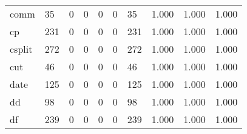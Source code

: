 \begin{longtable}{lp{2.0cm}p{2.0cm}p{2.0cm}p{2.0cm}p{2.0cm}p{2.0cm}p{2.0cm}p{2.0cm}p{2.0cm}}
comm      &                     35 &                                             0 &                                            0 &                                           0 &                                            0 &                                         35 &                                1.000 &                                  1.000 &                                1.000 \\
cp        &                    231 &                                             0 &                                            0 &                                           0 &                                            0 &                                        231 &                                1.000 &                                  1.000 &                                1.000 \\
csplit    &                    272 &                                             0 &                                            0 &                                           0 &                                            0 &                                        272 &                                1.000 &                                  1.000 &                                1.000 \\
cut       &                     46 &                                             0 &                                            0 &                                           0 &                                            0 &                                         46 &                                1.000 &                                  1.000 &                                1.000 \\
date      &                    125 &                                             0 &                                            0 &                                           0 &                                            0 &                                        125 &                                1.000 &                                  1.000 &                                1.000 \\
dd        &                     98 &                                             0 &                                            0 &                                           0 &                                            0 &                                         98 &                                1.000 &                                  1.000 &                                1.000 \\
df        &                    239 &                                             0 &                                            0 &                                           0 &                                            0 &                                        239 &                                1.000 &                                  1.000 &                                1.000 \\

\end{longtable}
